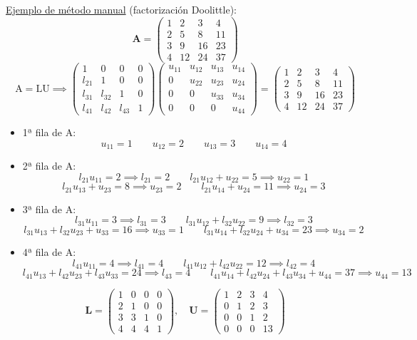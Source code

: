 \documentclass{article}
\begin{document}
\underline{Ejemplo de método manual} (factorización Doolittle):
\\
$$\textbf{A}=\begin{pmatrix}
1 & 2 & 3 & 4 \\
2 & 5 & 8 & 11 \\
3 & 9 & 16 & 23 \\
4 & 12 & 24 & 37
\end{pmatrix}$$
$$\text{A}=\text{LU}\implies\begin{pmatrix}
1 & 0 & 0 & 0 \\
l_{21} & 1 & 0 & 0 \\
l_{31} & l_{32} & 1 & 0 \\
l_{41} & l_{42} & l_{43} & 1
\end{pmatrix}\begin{pmatrix}
u_{11} & u_{12} & u_{13} & u_{14} \\
0 & u_{22} & u_{23} & u_{24} \\
0 & 0 & u_{33} & u_{34} \\
0 & 0 & 0 & u_{44}
\end{pmatrix}=\begin{pmatrix}
1 & 2 & 3 & 4 \\
2 & 5 & 8 & 11 \\
3 & 9 & 16 & 23 \\
4 & 12 & 24 & 37
\end{pmatrix}$$
\begin{itemize}
\item 1ª fila de A:
$$u_{11}=1\quad\quad u_{12}=2\quad\quad u_{13}=3\quad\quad u_{14}=4$$
\item 2ª fila de A:
$$l_{21}u_{11}=2\implies l_{21}=2\quad\quad l_{21}u_{12}+u_{22}=5\implies u_{22}=1$$
$$l_{21}u_{13}+u_{23}=8\implies u_{23}=2\quad\quad l_{21}u_{14}+u_{24}=11\implies u_{24}=3$$
\item 3ª fila de A:
$$l_{31}u_{11}=3\implies l_{31}=3\quad\quad l_{31}u_{12}+l_{32}u_{22}=9\implies l_{32}=3$$
$$l_{31}u_{13}+l_{32}u_{23}+u_{33}=16\implies u_{33}=1\quad\quad l_{31}u_{14}+l_{32}u_{24}+u_{34}=23\implies u_{34}=2$$
\item 4ª fila de A:
$$l_{41}u_{11}=4\implies l_{41}=4\quad\quad l_{41}u_{12}+l_{42}u_{22}=12\implies l_{42}=4$$
$$l_{41}u_{13}+l_{42}u_{23}+l_{43}u_{33}=24\implies l_{43}=4\quad\quad l_{41}u_{14}+l_{42}u_{24}+l_{43}u_{34}+u_{44}=37\implies u_{44}=13$$
\end{itemize}
$$\textbf{L}=\begin{pmatrix}
1 & 0 & 0 & 0 \\
2 & 1 & 0 & 0 \\
3 & 3 & 1 & 0 \\
4 & 4 & 4 & 1
\end{pmatrix},\quad\textbf{U}=\begin{pmatrix}
1 & 2 & 3 & 4 \\
0 & 1 & 2 & 3 \\
0 & 0 & 1 & 2 \\
0 & 0 & 0 & 13
\end{pmatrix}$$
\end{document}
